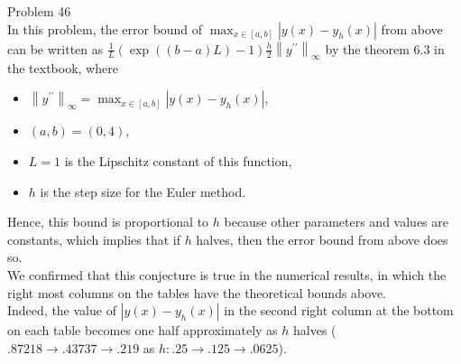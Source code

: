\documentclass[dvipdfmx]{article}
\newcommand{\norm}[1]{\left\lVert#1\right\rVert}
\begin{document}
Problem 46\\
In this problem, the error bound of $\max_{x \in [a,b]}\left|y(x)-y_h(x)\right|$
from above can be written as 
$\frac{1}{L}\left(\exp\left((b-a)L\right) - 1\right) \frac{h}{2} \norm{y^{\prime\prime}}_{\infty}$ 
by the theorem $6.3$ in the textbook, 
where 
\begin{itemize}
  \item $\norm{y^{\prime\prime}}_{\infty} = \max_{x \in [a,b]}\left|y(x)-y_h(x)\right|$,
  \item $(a,b) = (0, 4)$,
  \item $L = 1$ is the Lipschitz constant of this function, 
  \item $h$ is the step size for the Euler method.
\end{itemize}
Hence, this bound is proportional to $h$ because other parameters and values are constants, which implies that if $h$ halves, then the error bound from above does so.\\
We confirmed that this conjecture is true in the numerical results, in which the right most columns on the tables have the theoretical bounds above.\\
Indeed, the value of $\left|y(x)-y_h(x)\right|$ in the second right column at the bottom on each table becomes one half approximately as $h$ halves ($.87218 \to .43737 \to .219$ as $h: .25 \to .125 \to .0625$).
\end{document}
